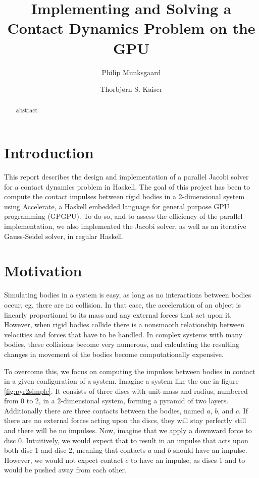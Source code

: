 \documentclass[runningheads,a4paper]{llncs}
\title{Implementing and Solving a Contact Dynamics Problem on the GPU}
\author{Philip Munksgaard \and Thorbjørn S. Kaiser}
\institute{
    University of Copenhagen Department of Computer Science (DIKU), \\
    Nørre Campus, Universitetsparken 5, DK-2100 Copenhagen Ø, Denmark
}
\begin{document}
\mainmatter
\maketitle

\begin{abstract}
abstract
\end{abstract}

\section{Introduction}

This report describes the design and implementation of a parallel Jacobi solver
for a contact dynamics problem in Haskell. The goal of this project has been to
compute the contact impulses between rigid bodies in a 2-dimensional system
using Accelerate, a Haskell embedded language for general purpose GPU
programming (GPGPU). To do so, and to assess the efficiency of the parallel
implementation, we also implemented the Jacobi solver, as well as an iterative
Gauss-Seidel solver, in regular Haskell.


\section{Motivation}

Simulating bodies in a system is easy, as long as no interactions between
bodies occur, eg. there are no collision. In that case, the acceleration of an
object is linearly proportional to its mass and any external forces that act
upon it. However, when rigid bodies collide there is a nonsmooth relationship
between velocities and forces that have to be handled. In complex systems with
many bodies, these collisions become very numerous, and calculating the
resulting changes in movement of the bodies become computationally expensive.


To overcome this, we focus on computing the impulses between bodies in contact
in a given configuration of a system. Imagine a system like the one in figure
\ref{fig:pyr2simple}. It consists of three discs with unit mass and radius,
numbered from 0 to 2, in a 2-dimensional system, forming a pyramid of two
layers. Additionally there are three contacts between the bodies, named $a$,
$b$, and $c$. If there are no external forces acting upon the discs, they will
stay perfectly still and there will be no impulses. Now, imagine that we apply
a downward force to disc 0. Intuitively, we would expect that to result in an
impulse that acts upon both disc 1 and disc 2, meaning that contacts $a$ and
$b$ should have an impulse. However, we would not expect contact $c$ to have an
impulse, as discs 1 and to would be pushed away from each other.
\end{document}
